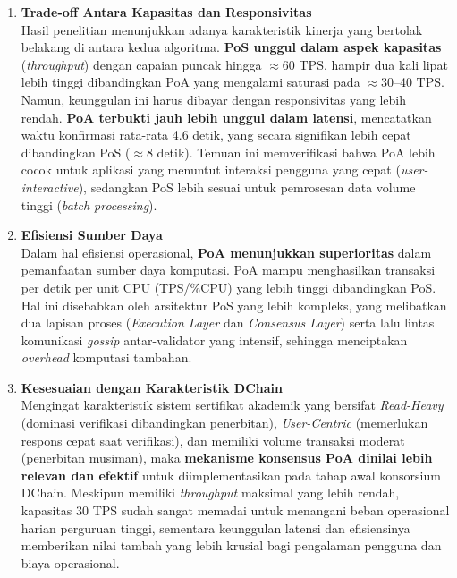 \begin{enumerate}
    \item \textbf{Trade-off Antara Kapasitas dan Responsivitas} \\
    Hasil penelitian menunjukkan adanya karakteristik kinerja yang bertolak belakang di antara kedua algoritma. \textbf{PoS unggul dalam aspek kapasitas} (\textit{throughput}) dengan capaian puncak hingga $\approx$60 TPS, hampir dua kali lipat lebih tinggi dibandingkan PoA yang mengalami saturasi pada $\approx$30--40 TPS. Namun, keunggulan ini harus dibayar dengan responsivitas yang lebih rendah. \textbf{PoA terbukti jauh lebih unggul dalam latensi}, mencatatkan waktu konfirmasi rata-rata 4.6 detik, yang secara signifikan lebih cepat dibandingkan PoS ($\approx$8 detik). Temuan ini memverifikasi bahwa PoA lebih cocok untuk aplikasi yang menuntut interaksi pengguna yang cepat (\textit{user-interactive}), sedangkan PoS lebih sesuai untuk pemrosesan data volume tinggi (\textit{batch processing}).

    \item \textbf{Efisiensi Sumber Daya} \\
    Dalam hal efisiensi operasional, \textbf{PoA menunjukkan superioritas} dalam pemanfaatan sumber daya komputasi. PoA mampu menghasilkan transaksi per detik per unit CPU (TPS/\%CPU) yang lebih tinggi dibandingkan PoS. Hal ini disebabkan oleh arsitektur PoS yang lebih kompleks, yang melibatkan dua lapisan proses (\textit{Execution Layer} dan \textit{Consensus Layer}) serta lalu lintas komunikasi \textit{gossip} antar-validator yang intensif, sehingga menciptakan \textit{overhead} komputasi tambahan.

    \item \textbf{Kesesuaian dengan Karakteristik DChain} \\
    Mengingat karakteristik sistem sertifikat akademik yang bersifat \textit{Read-Heavy} (dominasi verifikasi dibandingkan penerbitan), \textit{User-Centric} (memerlukan respons cepat saat verifikasi), dan memiliki volume transaksi moderat (penerbitan musiman), maka \textbf{mekanisme konsensus PoA dinilai lebih relevan dan efektif} untuk diimplementasikan pada tahap awal konsorsium DChain. Meskipun memiliki \textit{throughput} maksimal yang lebih rendah, kapasitas 30 TPS sudah sangat memadai untuk menangani beban operasional harian perguruan tinggi, sementara keunggulan latensi dan efisiensinya memberikan nilai tambah yang lebih krusial bagi pengalaman pengguna dan biaya operasional.
\end{enumerate}

